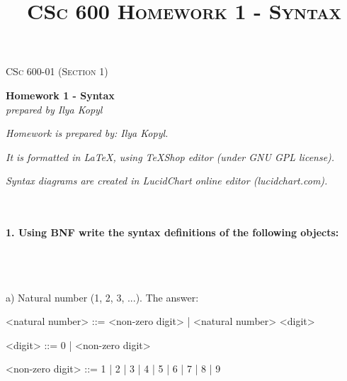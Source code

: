 \documentclass{article}
\begin{document}
	\setlength{\grammarparsep}{5pt plus 1pt minus 1pt} %
	\setlength{\grammarindent}{13em} %




	\begin{titlepage}
		\begin{center}
				\Large\textsc{CSc 600-01 (Section 1)}
				
				\Large\textbf{Homework 1 - Syntax}\\

				\Large\textit{prepared by Ilya Kopyl}
				
		\end{center}	
	\end{titlepage}


	\title{\textsc{CSc 600 Homework 1 - Syntax}}	
	\maketitle
	
		\textit{Homework is prepared by: Ilya Kopyl.}

		\textit{It is formatted in LaTeX, using TeXShop editor (under GNU GPL license).}
		
		\textit{Syntax diagrams are created in LucidChart online editor (lucidchart.com).}


	\rmfamily\




	\paragraph{1. Using BNF write the syntax definitions of the following objects:}\
	\rmfamily\\\
	
		a) Natural number (1, 2, 3, ...). The answer:
			
	\ttfamily
	\begin{grammar}
	
		<natural number> ::= <non-zero digit> | <natural number> <digit>

		<digit> ::= 0 | <non-zero digit>

		<non-zero digit> ::= 1 | 2 | 3 | 4 | 5 | 6 | 7 | 8 | 9
		
	\end{grammar}
	
\end{document}
